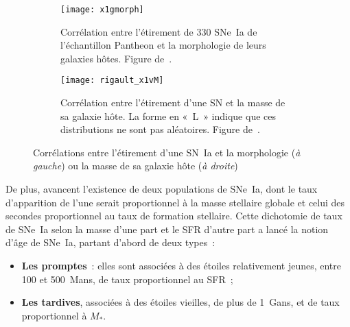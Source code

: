 \documentclass[../main/main.tex]{subfiles}
\begin{document}
\begin{figure}[ht]
    \centering
    \begin{subfigure}[c]{.48\linewidth}
        \centering
        \texttt{[image: x1gmorph]}
        \caption[Corrélation entre l'étirement des SNe~Ia et la morphologie de
        leurs galaxies hôtes]{Corrélation entre l'étirement de 330 SNe~Ia de
            l'échantillon Pantheon \citep{scolnic2018} et la morphologie de
        leurs galaxies hôtes. Figure de~\cite{pruzhinskaya2020}.}
        \label{fig:x1gmorph}
    \end{subfigure}
    \hfill
    \begin{subfigure}[c]{.48\linewidth}
        \centering
        \texttt{[image: rigault\_x1vM]}
        \caption[Corrélation entre l'étirement d'une SN et la masse de sa
        galaxie hôte]{Corrélation entre l'étirement d'une SN et la masse de sa
            galaxie hôte. La forme en «~L~» indique que ces distributions ne
        sont pas aléatoires. Figure de~\cite{rigault2013}.}
        \label{fig:mcorrx1}
    \end{subfigure}
    \caption[Corrélations entre l'étirement d'une SN~Ia et la morphologie ou la
    masse de sa galaxie hôte]{Corrélations entre l'étirement d'une SN~Ia et la
        morphologie (\textit{à gauche}) ou la masse de sa galaxie hôte
    (\textit{à droite})}
    \label{fig:x1corrs}
\end{figure}

De plus, \cite{mannucci2005, scannapieco2005, sullivan2006} avancent l'existence
de deux populations de SNe~Ia, dont le taux d'apparition de l'une serait
proportionnel à la masse stellaire globale et celui des secondes proportionnel
au taux de formation stellaire. Cette dichotomie de taux de SNe~Ia selon la
masse d'une part et le SFR d'autre part a lancé la notion d'âge de SNe~Ia,
partant d'abord de deux types~:
\begin{itemize}
    \item \textbf{Les promptes}~: elles sont associées à des étoiles
        relativement jeunes, entre \num{100} et \SI{500}{Mans}, de taux
        proportionnel au SFR~;
    \item \textbf{Les tardives}, associées à des étoiles vieilles, de plus de
        \SI{1}{Gans}, et de taux proportionnel à $M_*$.
\end{itemize}
\end{document}
